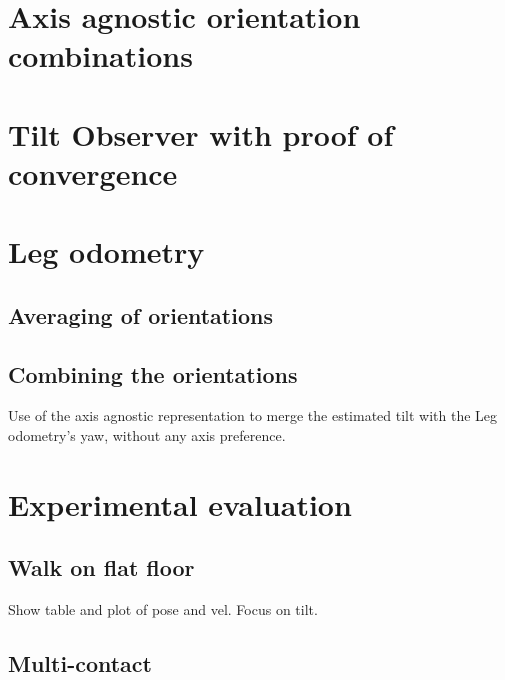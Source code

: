 \documentclass{IJCAS}
\begin{document}
\section{Axis agnostic orientation combinations}

\section{Tilt Observer with proof of convergence}

\section{Leg odometry}

\subsection{Averaging of orientations}

\subsection{Combining the orientations}
Use of the axis agnostic representation to merge the estimated tilt with the Leg odometry's yaw, without any axis preference.

\section{Experimental evaluation}


\subsection{Walk on flat floor}
Show table and plot of pose and vel. Focus on tilt.

\subsection{Multi-contact}
\end{document}
